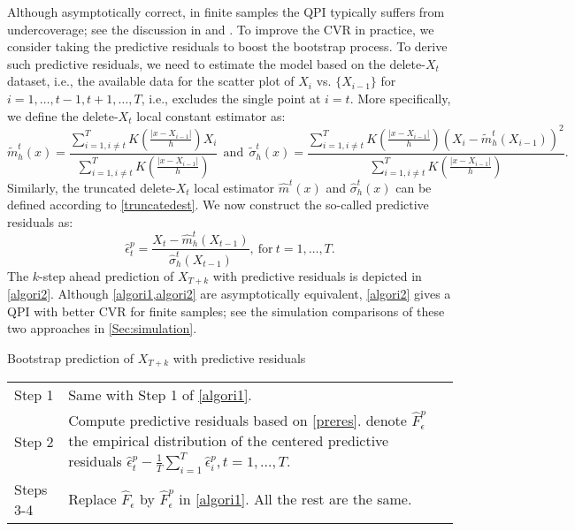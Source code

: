 \documentclass[a4paper]{article}
\begin{document}
Although asymptotically correct, in finite samples the QPI typically suffers 
from undercoverage; see the discussion in \cite{politis2015model} and \cite{pan2016bootstrap}. To improve the CVR in practice, we consider taking the predictive residuals to boost the bootstrap process. To derive such predictive residuals, 
we need to estimate the model based on the delete-$X_t$ dataset, i.e., the available data for the scatter plot of $X_{i}$ vs. $\{X_{i-1}\}$ for $i = 1,\ldots,t-1,t+1,\ldots, T$, i.e., excludes the single point at $i = t$. More specifically, we define the   delete-$X_{t}$ local constant estimator as:
\begin{equation}\label{estimator-pre-res}
    \widetilde{m}^{t}_h(x) =  \frac{\sum_{i=1, i\neq t}^{T}K(\frac{|x-X_{i-1}|}{h})X_{i}}{\sum_{i=1, i\neq t}^{T}K(\frac{|x-X_{i-1}|}{h})} ~~\text{and}~~ \widetilde{\sigma}^{t}_h(x) = \frac{\sum_{i=1, i\neq t}^{T}K(\frac{|x-X_{i-1}|}{h})(X_{i}-\widetilde{m}^t_h(X_{i-1}))^2}{\sum_{i=1, i\neq t}^{T}K(\frac{|x-X_{i-1}|}{h})}.
\end{equation}
Similarly, the truncated delete-$X_{t}$ local estimator $\widehat{m}^{t}(x)$ and $\widehat{\sigma}^{t}_h(x)$ can be defined according to \cref{truncatedest}. We
now construct the so-called predictive residuals as:
\begin{equation}\label{preres}
    \hat{\epsilon}^p_{t} = \frac{X_t - \widehat{m}^{t}_h(X_{t-1})}{\widehat{\sigma}^{t}_h(X_{t-1})},~\text{for}~t=1,\ldots,T.
\end{equation}
The $k$-step ahead prediction of $X_{T+k}$ with predictive residuals is depicted in \cref{algori2}. Although \cref{algori1,algori2} are asymptotically equivalent, \cref{algori2} gives a QPI with better CVR for finite samples; see the simulation comparisons of these two approaches in \cref{Sec:simulation}. 
\begin{algorithm}[htbp]
\caption{Bootstrap prediction of $X_{T+k}$ with predictive residuals} 
\label{algori2}
  \begin{tabularx}{\textwidth}{lX}   
    Step 1 & Same with Step 1 of \cref{algori1}.\\
    Step 2 & Compute predictive residuals based on \cref{preres}. 
denote $\widehat{F}^p_{\epsilon}$ the empirical distribution of the
centered predictive  residuals $\hat{\epsilon}^p_t - \frac{1}{T}\sum_{i=1}^{T}\hat{\epsilon}^p_i, t= 1,\ldots,T$.\\
    Steps 3-4 &  Replace $\widehat{F}_{\epsilon}$ by $\widehat{F}^{p}_{\epsilon}$ in \cref{algori1}. All the rest are  the same. 
  \end{tabularx}
\end{algorithm}
\end{document}
